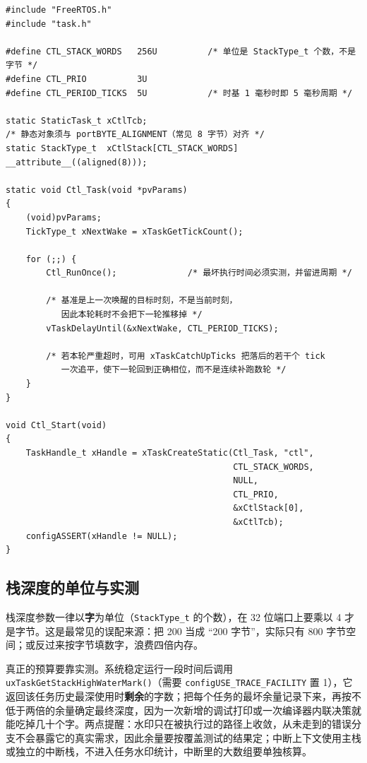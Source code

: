 \documentclass[12pt,a4paper,fontset=fandol]{ctexbook}
\newcommand{\Fn}[1]{\texttt{#1()}}
\newcommand{\Tp}[1]{\texttt{#1}}
\newcommand{\Bk}{\discretionary{}{}{}}
\begin{document}
\begin{lstlisting}[style=cstyle,caption={C：静态创建的周期任务，用绝对唤醒时间避免漂移},label={lst:ch06-static-periodic}]
#include "FreeRTOS.h"
#include "task.h"

#define CTL_STACK_WORDS   256U          /* 单位是 StackType_t 个数，不是字节 */
#define CTL_PRIO          3U
#define CTL_PERIOD_TICKS  5U            /* 时基 1 毫秒时即 5 毫秒周期 */

static StaticTask_t xCtlTcb;
/* 静态对象须与 portBYTE_ALIGNMENT（常见 8 字节）对齐 */
static StackType_t  xCtlStack[CTL_STACK_WORDS] __attribute__((aligned(8)));

static void Ctl_Task(void *pvParams)
{
    (void)pvParams;
    TickType_t xNextWake = xTaskGetTickCount();

    for (;;) {
        Ctl_RunOnce();              /* 最坏执行时间必须实测，并留进周期 */

        /* 基准是上一次唤醒的目标时刻，不是当前时刻，
           因此本轮耗时不会把下一轮推移掉 */
        vTaskDelayUntil(&xNextWake, CTL_PERIOD_TICKS);

        /* 若本轮严重超时，可用 xTaskCatchUpTicks 把落后的若干个 tick
           一次追平，使下一轮回到正确相位，而不是连续补跑数轮 */
    }
}

void Ctl_Start(void)
{
    TaskHandle_t xHandle = xTaskCreateStatic(Ctl_Task, "ctl",
                                             CTL_STACK_WORDS,
                                             NULL,
                                             CTL_PRIO,
                                             &xCtlStack[0],
                                             &xCtlTcb);
    configASSERT(xHandle != NULL);
}
\end{lstlisting}

\subsection{栈深度的单位与实测}

栈深度参数一律以\textbf{字}为单位（\Tp{StackType\_t} 的个数），在 32 位端口上要乘以 4 才是字节。这是最常见的误配来源：把 200 当成 ``200 字节''，实际只有 800 字节空间；或反过来按字节填数字，浪费四倍内存。

真正的预算要靠实测。系统稳定运行一段时间后调用 \Fn{uxTaskGet{\Bk}Stack{\Bk}High{\Bk}Water{\Bk}Mark}（需要 \Tp{configUSE\_{\Bk}TRACE\_{\Bk}FACILITY} 置 1），它返回该任务历史最深使用时\textbf{剩余}的字数；把每个任务的最坏余量记录下来，再按不低于两倍的余量确定最终深度，因为一次新增的调试打印或一次编译器内联决策就能吃掉几十个字。两点提醒：水印只在被执行过的路径上收敛，从未走到的错误分支不会暴露它的真实需求，因此余量要按覆盖测试的结果定；中断上下文使用主栈或独立的中断栈，不进入任务水印统计，中断里的大数组要单独核算。
\end{document}
